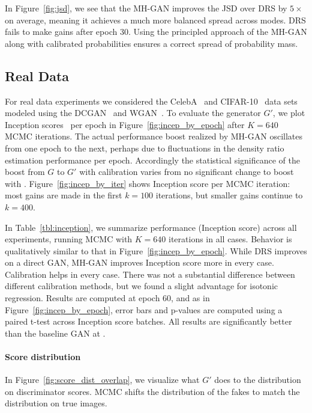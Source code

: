 \documentclass{article}
\begin{document}



In Figure~\ref{fig:jsd}, we see that the MH-GAN improves the JSD over DRS by $5 \times$ on average, meaning it achieves a much more balanced spread across modes.
DRS fails to make gains after epoch 30.
Using the principled approach of the MH-GAN along with calibrated probabilities ensures a correct spread of probability mass.

\subsection{Real Data}

For real data experiments we considered the CelebA~\citep{Liu2015} and CIFAR-10~\citep{Torralba2008} data sets modeled using the DCGAN~\citep{Radford2015} and WGAN~\citep{Arjovsky2017, Gulrajani2017}.
To evaluate the generator $G'$, we plot Inception scores~\citep{Salimans2016} per epoch in Figure~\ref{fig:incep_by_epoch} after $K=640$ MCMC iterations.
The actual performance boost realized by MH-GAN oscillates from one epoch to the next, perhaps due to fluctuations in the density ratio estimation performance per epoch.
Accordingly the statistical significance of the boost from $G$ to $G'$ with calibration varies from no significant change to boost with .
Figure~\ref{fig:incep_by_iter} shows Inception score per MCMC iteration:
most gains are made in the first $k=100$ iterations, but smaller gains continue to $k=400$.




In Table~\ref{tbl:inception}, we summarize performance (Inception score) across all experiments, running MCMC with $K=640$ iterations in all cases.
Behavior is qualitatively similar to that in Figure~\ref{fig:incep_by_epoch}.
While DRS improves on a direct GAN, MH-GAN improves Inception score more in every case.
Calibration helps in every case.
There was not a substantial difference between different calibration methods, but we found a slight advantage for isotonic regression.
Results are computed at epoch 60, and as in Figure~\ref{fig:incep_by_epoch}, error bars and p-values are computed using a paired t-test across Inception score batches.
All results are significantly better than the baseline GAN at .

\paragraph{Score distribution}
In Figure~\ref{fig:score_dist_overlap}, we visualize what $G'$ does to the distribution on discriminator scores.
MCMC shifts the distribution of the fakes to match the distribution on true images.
\end{document}
